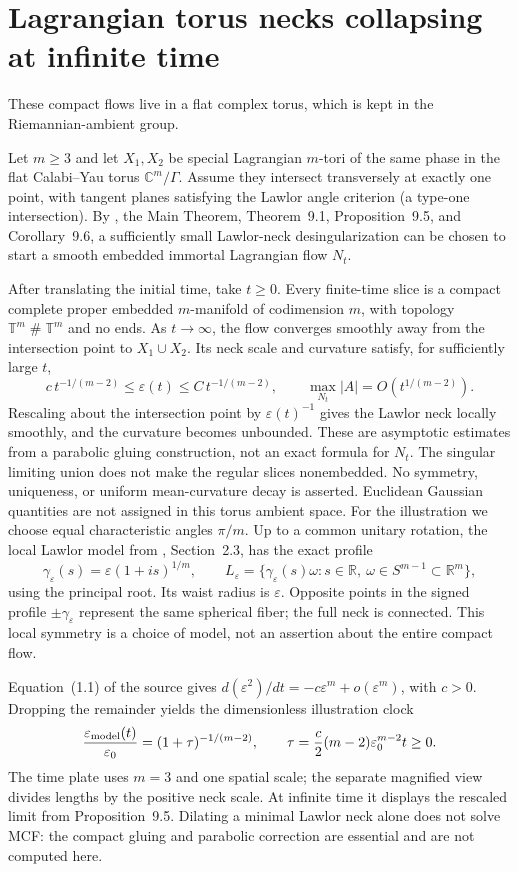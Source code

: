 \chapter{Lagrangian torus necks collapsing at infinite time}\label{sec:catalogue-su-tsai-wood}
These compact flows live in a flat complex torus, which is kept in the Riemannian-ambient group.
\begin{example}\label{ex:catalogue-su-tsai-wood}
Let $m\geq3$ and let $X_1,X_2$ be special Lagrangian $m$-tori of the same phase in the flat Calabi--Yau torus $\mathbb C^m/\Gamma$. Assume they intersect transversely at exactly one point, with tangent planes satisfying the Lawlor angle criterion (a type-one intersection). By \cite{CatSuTsaiWood2026}, the Main Theorem, Theorem~9.1, Proposition~9.5, and Corollary~9.6, a sufficiently small Lawlor-neck desingularization can be chosen to start a smooth embedded immortal Lagrangian flow $N_t$.

After translating the initial time, take $t\geq0$. Every finite-time slice is a compact complete proper embedded $m$-manifold of codimension $m$, with topology $\mathbb T^m\mathbin{\#}\mathbb T^m$ and no ends. As $t\to\infty$, the flow converges smoothly away from the intersection point to $X_1\cup X_2$. Its neck scale and curvature satisfy, for sufficiently large $t$,
\[
 c\,t^{-1/(m-2)}\leq\varepsilon(t)\leq C\,t^{-1/(m-2)},\qquad
 \max_{N_t}|A|=O(t^{1/(m-2)}).
\]
Rescaling about the intersection point by $\varepsilon(t)^{-1}$ gives the Lawlor neck locally smoothly, and the curvature becomes unbounded. These are asymptotic estimates from a parabolic gluing construction, not an exact formula for $N_t$. The singular limiting union does not make the regular slices nonembedded. No symmetry, uniqueness, or uniform mean-curvature decay is asserted. Euclidean Gaussian quantities are not assigned in this torus ambient space. For the illustration we choose equal characteristic angles $\pi/m$. Up to a common unitary rotation, the local Lawlor model from \cite{CatSuTsaiWood2026}, Section~2.3, has the exact profile
\[
 \gamma_\varepsilon(s)=\varepsilon(1+is)^{1/m},\qquad
 L_\varepsilon=\{\gamma_\varepsilon(s)\omega:s\in\mathbb R,\ \omega\in S^{m-1}\subset\mathbb R^m\},
\]
using the principal root. Its waist radius is $\varepsilon$. Opposite points in the signed profile $\pm\gamma_\varepsilon$ represent the same spherical fiber; the full neck is connected. This local symmetry is a choice of model, not an assertion about the entire compact flow.

Equation~(1.1) of the source gives $d(\varepsilon^2)/dt=-c\varepsilon^m+o(\varepsilon^m)$, with $c>0$. Dropping the remainder yields the dimensionless illustration clock
\[
 \frac{\varepsilon_{\rm model}(t)}{\varepsilon_0}=(1+\tau)^{-1/(m-2)},\qquad
 \tau=\frac c2(m-2)\varepsilon_0^{m-2}t\geq0.
\]
The time plate uses $m=3$ and one spatial scale; the separate magnified view divides lengths by the positive neck scale. At infinite time it displays the rescaled limit from Proposition~9.5. Dilating a minimal Lawlor neck alone does not solve MCF: the compact gluing and parabolic correction are essential and are not computed here.
\end{example}

